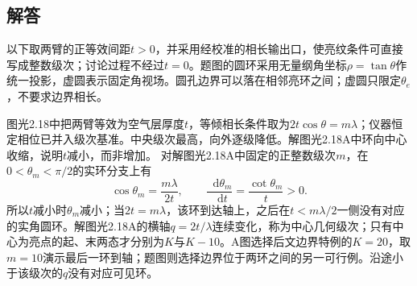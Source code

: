 \documentclass[UTF8,fontset=fandol,a4paper,11pt]{ctexart}
\newcommand{\dd}{\mathop{}\!\mathrm{d}}
\begin{document}
\subsection*{解答}


以下取两臂的正等效间距$t>0$，并采用经校准的相长输出口，使亮纹条件可直接写成整数级次；讨论过程不经过$t=0$。题图的圆环采用无量纲角坐标$\rho=\tan\theta$作统一投影，虚圆表示固定角视场。圆孔边界可以落在相邻亮环之间；虚圆只限定$\theta_e$，不要求边界相长。

图光2.18中把两臂等效为空气层厚度$t$，等倾相长条件取为$2t\cos\theta=m\lambda$；仪器恒定相位已并入级次基准。中央级次最高，向外逐级降低。解图光2.18A中环向中心收缩，说明$t$减小，而非增加。
对解图光2.18A中固定的正整数级次$m$，在$0<\theta_m<\pi/2$的实环分支上有
\[
\cos\theta_m=\frac{m\lambda}{2t},\qquad
\frac{\dd\theta_m}{\dd t}=\frac{\cot\theta_m}{t}>0.
\]
所以$t$减小时$\theta_m$减小；当$2t=m\lambda$，该环到达轴上，之后在$t<m\lambda/2$一侧没有对应的实角圆环。解图光2.18A的横轴$q=2t/\lambda$连续变化，称为中心几何级次；只有中心为亮点的起、末两态才分别为$K$与$K-10$。A图选择后文边界特例的$K=20$，取$m=10$演示最后一环到轴；题图则选择边界位于两环之间的另一可行例。沿途小于该级次的$q$没有对应可见环。
\end{document}
